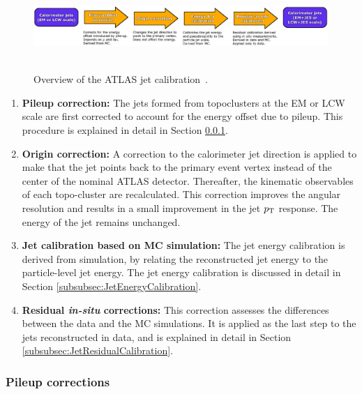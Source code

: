\begin{figure}[!ht]
  \begin{center}
    \mbox{
      \includegraphics[width=0.995\textwidth]{ObjectReconstruction/Figures/JetCalibrationFlow.eps}
    }
  \end{center}
  \caption{Overview of the ATLAS jet calibration~\cite{Aad:2014bia}.}
  \label{fig:JetCalibrationFlow}
\end{figure}


\begin{enumerate}
\item{\textbf{Pileup correction:}} The jets formed from topoclusters at the EM or LCW scale are first corrected to account for the energy offset due to pileup. This procedure is explained in detail in Section \ref{subsubsec:JetPileupCorrections}.

\item{\textbf{Origin correction:}} A correction to the calorimeter jet direction is applied to make that the jet points back to the primary event vertex instead of the center of the nominal ATLAS detector. 
Thereafter, the kinematic observables of each topo-cluster are recalculated.
This correction improves the angular resolution and results in a small improvement in the jet $p_{\mathrm{T}}$ response.
The energy of the jet remains unchanged. 

\item{\textbf{Jet calibration based on MC simulation:}} The jet energy calibration is derived from simulation, by relating the reconstructed jet energy to the particle-level jet energy. 
The jet energy calibration is discussed in detail in Section \ref{subsubsec:JetEnergyCalibration}.

\item{\textbf{Residual \emph{in-situ} corrections:}} This correction assesses the differences between the data and the MC simulations.
It is applied as the last step to the jets reconstructed in data, and is explained in detail in Section \ref{subsubsec:JetResidualCalibration}.
\end{enumerate}


\subsubsection{Pileup corrections}
    \label{subsubsec:JetPileupCorrections}

